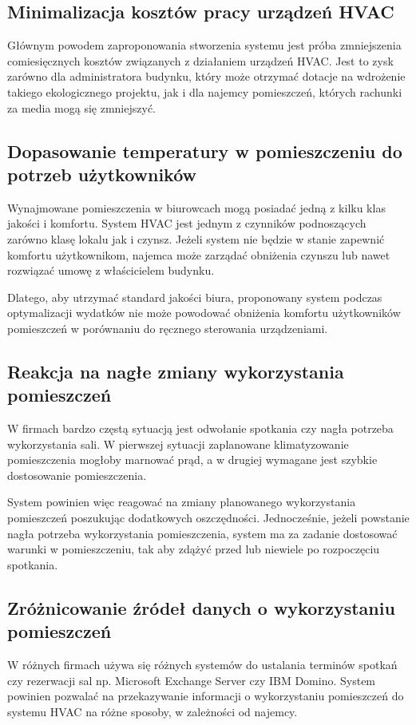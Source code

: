 \subsection*{Minimalizacja kosztów pracy urządzeń HVAC}
Głównym powodem zaproponowania stworzenia systemu jest próba zmniejszenia comiesięcznych kosztów związanych z działaniem urządzeń HVAC. Jest to zysk zarówno dla administratora budynku, który może otrzymać dotacje na wdrożenie takiego ekologicznego projektu, jak i dla najemcy pomieszczeń, których rachunki za media mogą się zmniejszyć.

\subsection*{Dopasowanie temperatury w pomieszczeniu do potrzeb użytkowników} 
Wynajmowane pomieszczenia w biurowcach mogą posiadać jedną z kilku klas jakości i komfortu. \cite{bib:klasyBudynkow} 
System HVAC jest jednym z czynników podnoszących zarówno klasę lokalu jak i czynsz. 
Jeżeli system nie będzie w stanie zapewnić komfortu użytkownikom, najemca może zarządać obniżenia czynszu lub nawet rozwiązać umowę z właścicielem budynku. 

Dlatego, aby utrzymać standard jakości biura, proponowany system podczas optymalizacji wydatków nie może powodować obniżenia komfortu użytkowników pomieszczeń w porównaniu do ręcznego sterowania urządzeniami.

\subsection*{Reakcja na nagłe zmiany wykorzystania pomieszczeń}
W firmach bardzo częstą sytuacją jest odwołanie spotkania czy nagła potrzeba wykorzystania sali.
W pierwszej sytuacji zaplanowane klimatyzowanie pomieszczenia mogłoby marnować prąd, a w drugiej wymagane jest szybkie dostosowanie pomieszczenia.

System powinien więc reagować na zmiany planowanego wykorzystania pomieszczeń poszukując dodatkowych oszczędności. 
Jednocześnie, jeżeli powstanie nagła potrzeba wykorzystania pomieszczenia, system ma za zadanie dostosować warunki w pomieszczeniu, tak aby zdążyć przed lub niewiele po rozpoczęciu spotkania.   

\subsection*{Zróżnicowanie źródeł danych o wykorzystaniu pomieszczeń}
W różnych firmach używa się różnych systemów do ustalania terminów spotkań czy rezerwacji sal np. Microsoft Exchange Server czy IBM Domino.
System powinien pozwalać na przekazywanie informacji o wykorzystaniu pomieszczeń do systemu HVAC na różne sposoby, w zależności od najemcy.

